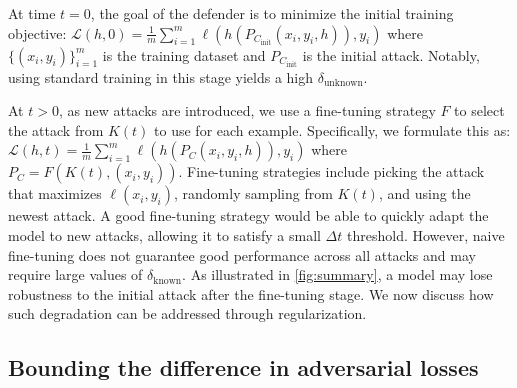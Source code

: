 
At time $t=0$, the goal of the defender is to minimize the initial training objective: $\mathcal{L}(h,0) = \frac{1}{m}\sum_{i=1}^m\ell(h(P_{C_\text{init}}(x_i, y_i, h)), y_i)$
where $\{(x_i, y_i)\}_{i=1}^m$ is the training dataset and $P_{C_\text{init}}$ is the initial attack. 
Notably, using standard training in this stage yields a high $\delta_\text{unknown}$.

At $t>0$, as new attacks are introduced, we use a fine-tuning strategy $F$ to select the attack from $K(t)$ to use for each example.  Specifically, we formulate this as:
$    \mathcal{L}(h, t) = \frac{1}{m}\sum_{i=1}^m \ell(h(P_{C}(x_i, y_i, h)), y_i)$ where $P_{C}= F(K(t), (x_i, y_i))$.
Fine-tuning strategies include picking the attack that maximizes $\ell(x_i, y_i)$, randomly sampling from $K(t)$, and using the newest attack.  A good fine-tuning strategy would be able to quickly adapt the model to new attacks, allowing it to satisfy a small $\Delta t$ threshold.
However, naive fine-tuning does not guarantee good performance across all attacks and may require large values of $\delta_\text{known}$. 
As illustrated in \cref{fig:summary}, a model may lose robustness to the initial attack after the fine-tuning stage. We now discuss how such degradation can be addressed through regularization.

\subsection{Bounding the difference in adversarial losses}\label{subsec: theory}

